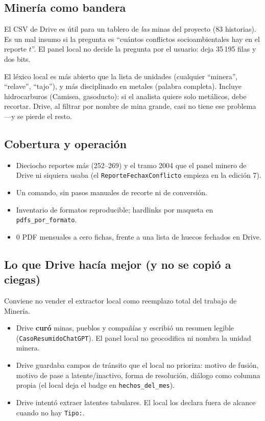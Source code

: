 \documentclass[11pt,a4paper]{article}
\begin{document}
\subsection{Minería como bandera}

El CSV de Drive es útil para un tablero de \emph{las} minas del proyecto (83 historias). Es un mal insumo si la pregunta es ``cuántos conflictos socioambientales hay en el reporte $t$''. El panel local no decide la pregunta por el usuario: deja 35\,195 filas y dos bits.

El léxico local es más abierto que la lista de unidades (cualquier ``minera'', ``relave'', ``tajo''), y más disciplinado en metales (palabra completa). Incluye hidrocarburos (Camisea, gasoducto): si el analista quiere solo metálicos, debe recortar. Drive, al filtrar por nombre de mina grande, casi no tiene ese problema ---y se pierde el resto.

\subsection{Cobertura y operación}

\begin{itemize}
  \item Dieciocho reportes más (252--269) y el tramo 2004 que el panel minero de Drive ni siquiera usaba (el \texttt{ReporteFechaxConflicto} empieza en la edición 7).
  \item Un comando, sin pasos manuales de recorte ni de conversión.
  \item Inventario de formatos reproducible; hardlinks por maqueta en \texttt{pdfs\_por\_formato}.
  \item 0 PDF mensuales a cero fichas, frente a una lista de huecos fechados en Drive.
\end{itemize}

\subsection{Lo que Drive hacía mejor (y no se copió a ciegas)}

Conviene no vender el extractor local como reemplazo total del trabajo de Minería.

\begin{itemize}
  \item Drive \textbf{curó} minas, pueblos y compañías y escribió un resumen legible (\texttt{CasoResumidoChatGPT}). El panel local no geocodifica ni nombra la unidad minera.
  \item Drive guardaba campos de tránsito que el local no prioriza: motivo de fusión, motivo de pase a latente/inactivo, forma de resolución, diálogo como columna propia (el local deja el badge en \texttt{hechos\_del\_mes}).
  \item Drive intentó extraer latentes tabulares. El local los declara fuera de alcance cuando no hay \texttt{Tipo:}.
\end{itemize}
\end{document}
